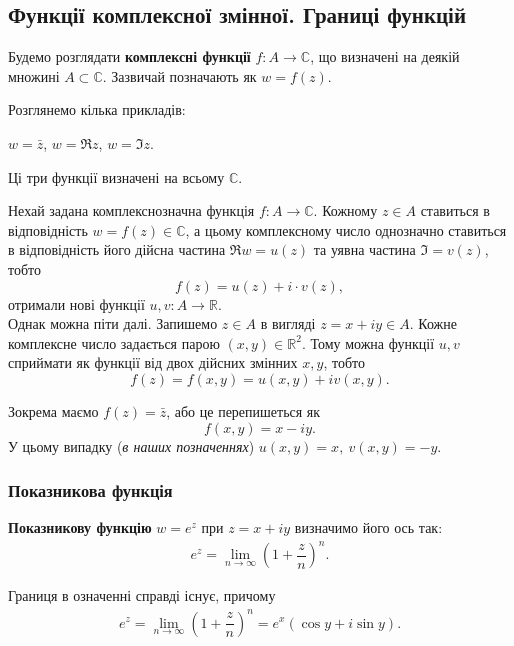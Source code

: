 \documentclass{math_library}
\begin{document}
\subsection{Функції комплексної змінної. Границі функцій}
Будемо розглядати \textbf{комплексні функції} $f \colon A \to \mathbb{C}$, що визначені на деякій множині $A \subset \mathbb{C}$. Зазвичай позначають як $w = f(z)$.

\begin{example}
Розглянемо кілька прикладів:
\begin{center}
$w = \bar{z}$, \qquad $w = \Re z$, \qquad $w = \Im z$.
\end{center}
Ці три функції визначені на всьому $\mathbb{C}$.
\end{example}

\begin{remark}
Нехай задана комплекснозначна функція $f \colon A \to \mathbb{C}$. Кожному $z \in A$ ставиться в відповідність $w = f(z) \in \mathbb{C}$, а цьому комплексному число однозначно ставиться в відповідність його дійсна частина $\Re w = u(z)$ та уявна частина $\Im = v(z)$, тобто
\[
f(z) = u(z) + i \cdot v(z),
\]
отримали нові функції $u,v \colon A \to \mathbb{R}$.
\bigskip \\
Однак можна піти далі. Запишемо $z \in A$ в вигляді $z = x+iy \in A$. Кожне комплексне число задається парою $(x,y) \in \mathbb{R}^2$. Тому можна функції $u,v$ сприймати як функції від двох дійсних змінних $x,y$, тобто
\[
f(z) = f(x,y) = u(x,y) + iv(x,y).
\]
\end{remark}

\begin{example}
Зокрема маємо $f(z) = \bar{z}$, або це перепишеться як
\[
f(x,y) = x - iy.
\]
У цьому випадку (\textit{в наших позначеннях}) $u(x,y) = x,\ v(x,y) = -y$.
\end{example}

\subsubsection{Показникова функція}
\begin{definition}
\textbf{Показникову функцію} $w = e^z$ при $z = x+iy$ визначимо його ось так:
\begin{align*}
e^z = \lim_{n \to \infty} \left( 1 + \dfrac{z}{n} \right)^n.
\end{align*}
\end{definition}

\begin{proposition}
Границя в означенні справді існує, причому
\begin{align*}
e^z = \lim_{n \to \infty} \left( 1 + \dfrac{z}{n} \right)^n = e^x (\cos y + i \sin y).
\end{align*}
\end{proposition}
\end{document}
